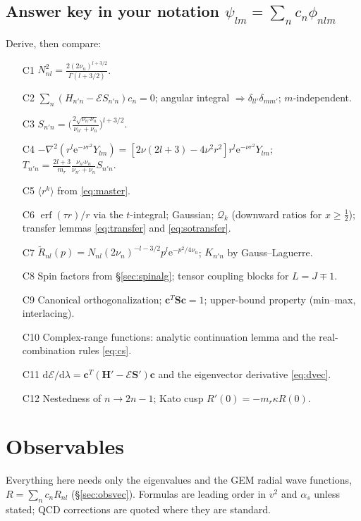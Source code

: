 \documentclass[11pt,a4paper]{article}
\numberwithin{equation}{section}
\theoremstyle{definition}
\theoremstyle{plain}
\theoremstyle{remark}
\numberwithin{algorithm}{section}
\newcommand{\as}{\alpha_s}
\newcommand{\dd}{\mathrm{d}}
\newcommand{\ee}{\mathrm{e}}
\newcommand{\erf}{\operatorname{erf}}
\newcommand{\mr}{m_r}
\newcommand{\mH}{\mathbf H}
\newcommand{\mS}{\mathbf S}
\newcommand{\vc}{\bm c}
\begin{document}
\subsection{\texorpdfstring{Answer key in your notation $\psi_{lm}=\sum_nc_n\phi_{nlm}$}{Answer key in the spinless notation}}\label{sec:key}
Derive, then compare:
\begin{enumerate}[leftmargin=2.1em,itemsep=2pt]
\item[C1] $N_{nl}^2=\frac{2(2\nu_n)^{l+3/2}}{\Gamma(l+3/2)}$.
\item[C2] $\sum_n(H_{n'n}-\mathcal ES_{n'n})c_n=0$; angular integral $\Rightarrow\delta_{ll'}\delta_{mm'}$; $m$-independent.
\item[C3] $S_{n'n}=\big(\frac{2\sqrt{\nu_{n'}\nu_n}}{\nu_{n'}+\nu_n}\big)^{l+3/2}$.
\item[C4] $-\nabla^2(r^l\ee^{-\nu r^2}Y_{lm})=[2\nu(2l+3)-4\nu^2r^2]r^l\ee^{-\nu r^2}Y_{lm}$; $T_{n'n}=\frac{2l+3}{\mr}\frac{\nu_{n'}\nu_n}{\nu_{n'}+\nu_n}S_{n'n}$.
\item[C5] $\langle r^k\rangle$ from \eqref{eq:master}.
\item[C6] $\erf(\tau r)/r$ via the $t$-integral; Gaussian; $\mathcal Q_k$ (downward ratios for $x\ge\frac12$); transfer lemmas \eqref{eq:transfer} and \eqref{eq:sotransfer}.
\item[C7] $\tilde R_{nl}(p)=N_{nl}(2\nu_n)^{-l-3/2}p^l\ee^{-p^2/4\nu_n}$; $K_{n'n}$ by Gauss--Laguerre.
\item[C8] Spin factors from \S\ref{sec:spinalg}; tensor coupling blocks for $L=J\mp1$.
\item[C9] Canonical orthogonalization; $\vc^T\mS\vc=1$; upper-bound property (min--max, interlacing).
\item[C10] Complex-range functions: analytic continuation lemma and the real-combination rules \eqref{eq:cs}.
\item[C11] $\dd\mathcal E/\dd\lambda=\vc^T(\mH'-\mathcal E\mS')\vc$ and the eigenvector derivative \eqref{eq:dvec}.
\item[C12] Nestedness of $n\to2n-1$; Kato cusp $R'(0)=-\mr\kappa R(0)$.
\end{enumerate}
\section{Observables}\label{sec:observables}
Everything here needs only the eigenvalues and the GEM radial wave functions, $R=\sum_nc_nR_{nl}$ (\S\ref{sec:obsvec}). Formulas are leading order in $v^2$ and $\as$ unless stated; QCD corrections are quoted where they are standard.
\end{document}
